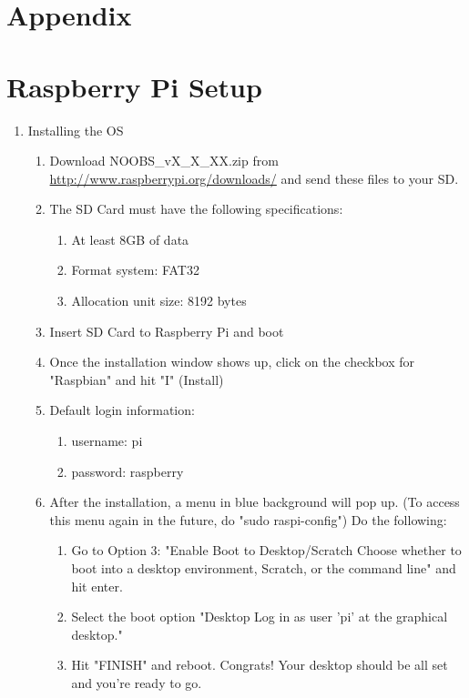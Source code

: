 \section{Appendix}
\appendix
\section{Raspberry Pi Setup}
\begin{enumerate}
    \item Installing the OS
        \begin{enumerate}[label*=\arabic*.]
            \item Download NOOBS\_vX\_X\_XX.zip from \url{http://www.raspberrypi.org/downloads/}    and send these files to your SD.
            \item The SD Card must have the following specifications:
                \begin{enumerate}[label*=\arabic*.]
                    \item At least 8GB of data
                    \item Format system: FAT32
                    \item Allocation unit size: 8192 bytes
                \end{enumerate}
            \item Insert SD Card to Raspberry Pi and boot
            \item Once the installation window shows up, click on the checkbox for "Raspbian" and hit "I" (Install)
            \item Default login information:
                \begin{enumerate}[label*=\arabic*.]
                    \item username: pi
                    \item password: raspberry
                \end{enumerate}
            \item After the installation, a menu in blue background will pop up. (To access this menu again in the future, do "sudo raspi-config") Do the following:
                \begin{enumerate}[label*=\arabic*.]
                    \item Go to Option 3: "Enable Boot to Desktop/Scratch Choose whether to boot into a desktop environment, Scratch, or the command line" and hit enter.
                    \item Select the boot option "Desktop Log in as user 'pi' at the graphical desktop."
                    \item Hit "FINISH" and reboot. Congrats! Your desktop should be all set and you're ready to go.
                \end{enumerate}
        \end{enumerate}


\end{enumerate}
